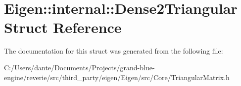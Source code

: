 \hypertarget{struct_eigen_1_1internal_1_1_dense2_triangular}{}\section{Eigen\+::internal\+::Dense2\+Triangular Struct Reference}
\label{struct_eigen_1_1internal_1_1_dense2_triangular}


The documentation for this struct was generated from the following file\+:\begin{DoxyCompactItemize}
\item 
C\+:/\+Users/dante/\+Documents/\+Projects/grand-\/blue-\/engine/reverie/src/third\+\_\+party/eigen/\+Eigen/src/\+Core/Triangular\+Matrix.\+h\end{DoxyCompactItemize}
